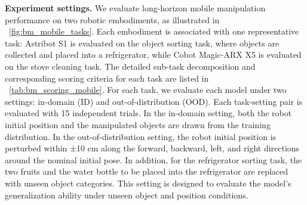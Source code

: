 \noindent\textbf{Experiment settings.} We evaluate long-horizon mobile manipulation performance on two robotic embodiments, as illustrated in ~\cref{fig:bm_mobile_tasks}. Each embodiment is associated with one representative task: Astribot S1 is evaluated on the object sorting task, where objects are collected and placed into a refrigerator, while Cobot Magic-ARX X5 is evaluated on the stove cleaning task. The detailed sub-task decomposition and corresponding scoring criteria for each task are listed in ~\cref{tab:bm_scoring_mobile}.
For each task, we evaluate each model under two settings: in-domain (ID) and out-of-distribution (OOD). Each task-setting pair is evaluated with 15 independent trials. In the in-domain setting, both the robot initial position and the manipulated objects are drawn from the training distribution. In the out-of-distribution setting, the robot initial position is perturbed within ±10 cm along the forward, backward, left, and right directions around the nominal initial pose. In addition, for the refrigerator sorting task, the two fruits and the water bottle to be placed into the refrigerator are replaced with unseen object categories. This setting is designed to evaluate the model’s generalization ability under unseen object and position conditions.

